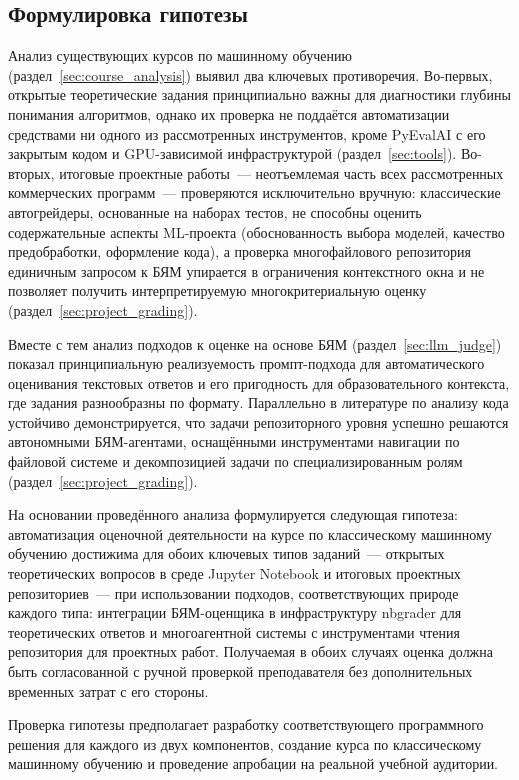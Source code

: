 \subsection{Формулировка гипотезы}\label{sec:hypothesis}

Анализ существующих курсов по машинному обучению (раздел~\ref{sec:course_analysis})
выявил два ключевых противоречия. Во-первых, открытые теоретические задания
принципиально важны для диагностики глубины понимания алгоритмов, однако их
проверка не поддаётся автоматизации средствами ни одного из рассмотренных
инструментов, кроме PyEvalAI с его закрытым кодом и GPU-зависимой
инфраструктурой (раздел~\ref{sec:tools}). Во-вторых, итоговые проектные
работы~--- неотъемлемая часть всех рассмотренных коммерческих программ~--- проверяются
исключительно вручную: классические автогрейдеры, основанные на наборах
тестов, не способны оценить содержательные аспекты ML-проекта (обоснованность
выбора моделей, качество предобработки, оформление кода), а проверка
многофайлового репозитория единичным запросом к БЯМ упирается в ограничения
контекстного окна и не позволяет получить интерпретируемую многокритериальную
оценку (раздел~\ref{sec:project_grading}).

Вместе с тем анализ подходов к оценке на основе БЯМ
(раздел~\ref{sec:llm_judge}) показал принципиальную реализуемость
промпт-подхода для автоматического оценивания текстовых ответов и его
пригодность для образовательного контекста, где задания разнообразны по
формату. Параллельно в литературе по анализу кода устойчиво демонстрируется,
что задачи репозиторного уровня успешно решаются автономными БЯМ-агентами,
оснащёнными инструментами навигации по файловой системе и декомпозицией
задачи по специализированным ролям (раздел~\ref{sec:project_grading}).

На основании проведённого анализа формулируется следующая гипотеза:
автоматизация оценочной деятельности на курсе по классическому машинному
обучению достижима для обоих ключевых типов заданий~--- открытых
теоретических вопросов в среде Jupyter Notebook и итоговых проектных
репозиториев~--- при использовании подходов, соответствующих природе
каждого типа: интеграции БЯМ-оценщика в инфраструктуру nbgrader для
теоретических ответов и многоагентной системы с инструментами чтения
репозитория для проектных работ. Получаемая в обоих случаях оценка
должна быть согласованной с ручной проверкой преподавателя без
дополнительных временных затрат с его стороны.

Проверка гипотезы предполагает разработку соответствующего программного
решения для каждого из двух компонентов, создание курса по классическому
машинному обучению и проведение апробации на реальной учебной аудитории.

